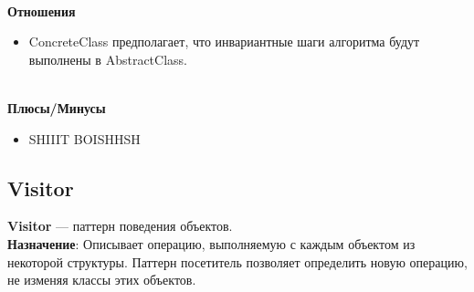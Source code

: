 \documentclass[a3paper,11pt]{report}
\begin{document}
\textbf{\\Отношения}
\begin{itemize}
\item ConcreteClass предполагает, что инвариантные шаги алгоритма будут выполнены в AbstractClass.
\end{itemize}

\textbf{\\Плюсы/Минусы}
\begin{itemize}
\item SHIIIT BOISHHSH
\end{itemize}

\newpage
\subsection{Visitor}

\large\textbf{Visitor} --- паттерн поведения объектов.
\\
\large\textbf{Назначение}: Описывает операцию, выполняемую с каждым объектом из некоторой структуры. Паттерн посетитель позволяет определить новую операцию, не изменяя классы этих объектов.
\\
\end{document}

